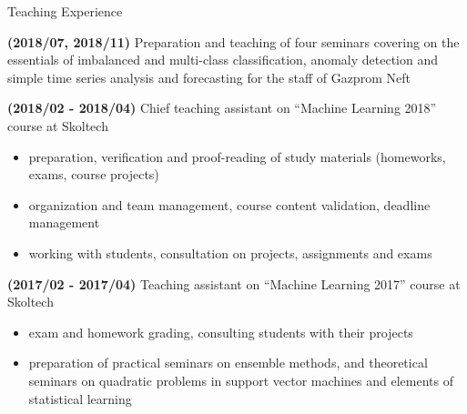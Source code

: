 \documentclass{resume} %
\begin{document}
\begin{rSection}{Teaching Experience}
    \item \textbf{(2018/07, 2018/11)} %
    Preparation and teaching of four seminars covering on the essentials of imbalanced and multi-class classification, anomaly detection and simple time series analysis and forecasting for the staff of Gazprom Neft

    \item \textbf{(2018/02 - 2018/04)}
    Chief teaching assistant on ``Machine Learning 2018'' course at Skoltech
    \begin{itemize}
        \item preparation, verification and proof-reading of study materials (homeworks, exams, course projects)
        
        \item organization and team management, course content validation, deadline management
        
        \item working with students, consultation on projects, assignments and exams
    \end{itemize}

    \item \textbf{(2017/02 - 2017/04)}
    Teaching assistant on ``Machine Learning 2017'' course at Skoltech
    \begin{itemize}
        \item exam and homework grading, consulting students with their projects

        \item preparation of practical seminars on ensemble methods, and theoretical seminars on quadratic problems in support vector machines and elements of statistical learning
    \end{itemize}
\end{rSection}
\end{document}
